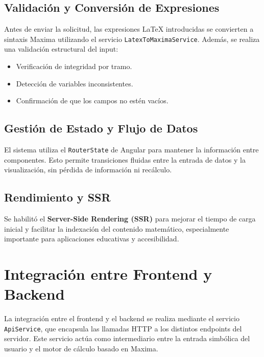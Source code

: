 \subsection{Validación y Conversión de Expresiones}

Antes de enviar la solicitud, las expresiones LaTeX introducidas se convierten a sintaxis Maxima utilizando el servicio \texttt{LatexToMaximaService}. Además, se realiza una validación estructural del input:

\begin{itemize}
	\item Verificación de integridad por tramo.
	\item Detección de variables inconsistentes.
	\item Confirmación de que los campos no estén vacíos.
\end{itemize}

\subsection{Gestión de Estado y Flujo de Datos}

El sistema utiliza el \texttt{RouterState} de Angular para mantener la información entre componentes. Esto permite transiciones fluidas entre la entrada de datos y la visualización, sin pérdida de información ni recálculo.

\subsection{Rendimiento y SSR}

Se habilitó el \textbf{Server-Side Rendering (SSR)} para mejorar el tiempo de carga inicial y facilitar la indexación del contenido matemático, especialmente importante para aplicaciones educativas y accesibilidad.

\vspace{1em}

\section{Integración entre Frontend y Backend}
\label{sec:integracion-frontend-backend}

La integración entre el frontend y el backend se realiza mediante el servicio \texttt{ApiService}, que encapsula las llamadas HTTP a los distintos endpoints del servidor. Este servicio actúa como intermediario entre la entrada simbólica del usuario y el motor de cálculo basado en Maxima.

